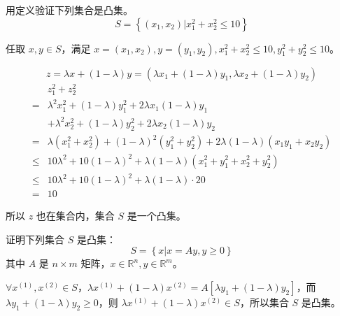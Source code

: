 \begin{problem}
    用定义验证下列集合是凸集。
    \[S = \left\{(x_1, x_2) | x_1^2 + x_2^2 \le 10\right\}\]
\end{problem}
\begin{solution}
    任取 $x,y\in S$，满足 $x=(x_1, x_2),y=(y_1, y_2),x_1^2 + x_2^2 \le 10, y_1^2 + y_2^2 \le 10$。

    \[z = \lambda x + (1 - \lambda)y = \left(\lambda x_1 + (1 - \lambda) y_1, \lambda x_2 + (1 - \lambda) y_2\right)\]
    \begin{align*}
        &z_1^2 + z_2^2\\
        =& \lambda^2 x_1^2 + (1-\lambda)y_1^2 + 2\lambda x_1(1-\lambda)y_1\\
        &+\lambda^2 x_2^2 + (1-\lambda)y_2^2 + 2\lambda x_2(1-\lambda)y_2\\
        =& \lambda (x_1^2 + x_2^2) + (1-\lambda)^2(y_1^2 + y_2^2) + 2\lambda(1 - \lambda)(x_1y_1 + x_2y_2)\\
        \le & 10\lambda^2 + 10(1-\lambda)^2 + \lambda(1 - \lambda)(x_1^2 + y_1^2 + x_2^2 + y_2^2)\\
        \le & 10\lambda^2 + 10(1-\lambda)^2 + \lambda(1 - \lambda)\cdot 20\\
        =& 10
    \end{align*}

    所以 $z$ 也在集合内，集合 $S$ 是一个凸集。
\end{solution}

\begin{problem}
    证明下列集合 $S$ 是凸集：
    \[S = \left\{x | x = Ay, y \ge 0\right\}\]
    其中 $A$ 是 $n\times m$ 矩阵，$x \in \mathbb{R}^n, y\in\mathbb{R}^m$。
\end{problem}
\begin{solution}
    $\forall x^{(1)}, x^{(2)} \in S$，$\lambda x^{(1)} + (1 - \lambda)x^{(2)}= A \left[\lambda y_1 + (1 - \lambda)y_2\right]$，而 $\lambda y_1 + (1 - \lambda)y_2 \ge 0$，则 $\lambda x^{(1)} + (1 - \lambda)x^{(2)} \in S$，所以集合 $S$ 是凸集。
\end{solution}

